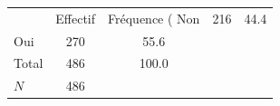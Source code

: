 {
\def\sym#1{\ifmmode^{#1}\else\(^{#1}\)\fi}
\begin{tabular}{l*{1}{cc}}
\toprule
            &    Effectif&Fréquence (%
\midrule
Non         &         216&        44.4\\
Oui         &         270&        55.6\\
Total       &         486&       100.0\\
\midrule
\(N\)       &         486&            \\
\bottomrule
\end{tabular}
}
